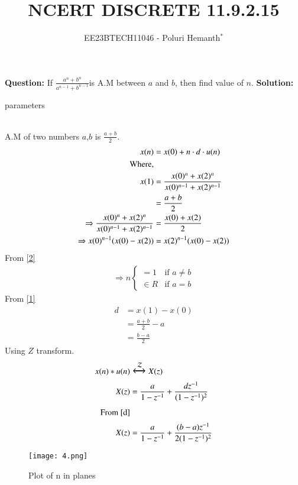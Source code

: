 \documentclass[journal,12pt,twocolumn]{IEEEtran}
\theoremstyle{remark}
\begin{document}

\vspace{3cm}


\title{NCERT DISCRETE 11.9.2.15}
\author{EE23BTECH11046 - Poluri Hemanth$^{*}$}
\maketitle
\textbf{Question:}
If \( \frac{a^n +b^n}{a^{n-1} + b^{n-1}}\)is A.M between $a$ and $b$, then find value of $n$.
\break
\textbf{Solution:}
\begin{table}[h!]
        
        \caption{parameters}
\end{table}
\\A.M of two numbers $a$,$b$ is $\frac{a+b}{2}$.
\begin{align}
	x(n)&=x(0)+n\cdot d\cdot u(n)\label{1}\\
	\notag\text{        Where,}\\
	x(1)&=\frac{x(0)^n +x(2)^n}{x(0)^{n-1} + x(2)^{n-1}}\label{r}\\ 
	&=\frac{a+b}{2}\\
	\Rightarrow\frac{x(0)^n +x(2)^n}{x(0)^{n-1} + x(2)^{n-1}}&= \frac{x(0)+x(2)}{2}  \\
    \Rightarrow x(0)^{n-1}(x(0)-x(2))&=x(2)^{n-1}(x(0)-x(2))\label{2}
\end{align}
From \eqref{2}
\begin{align}
        \Rightarrow n
        \begin{cases}
                =1  &\text{if } a\neq b\\
                \in R &\text{if } a=b
        \end{cases}
\end{align}
From \eqref{1}\\
\begin{align}
	d&=x(1)-x(0)\\
	&=\frac{a+b}{2}-a\\
	&=\frac{b-a}{2}\label{d}
\end{align}
Using $Z$ transform.
\begin{align}
	x(n)*u(n)&\Large\xleftrightarrow{\mathcal{Z}}X(z)\\
	X(z)&=\frac{a}{1-z^{-1}}+\frac{dz^{-1}}{(1-z^{-1})^2}\label{8}\\
	\notag\text{From \eqref{d}}\\
	X(z)&=\frac{a}{1-z^{-1}}+\frac{(b-a)z^{-1}}{2(1-z^{-1})^2}
\end{align}
\begin{figure}[h]
	\centering
	\texttt{[image: 4.png]}
	\caption{Plot of n in planes}
	\label{solution}
\end{figure}

 
\end{document}
